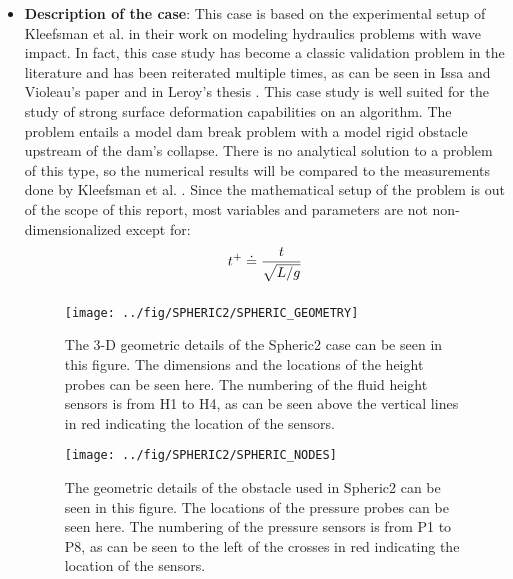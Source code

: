 \documentclass{../GPUSPHtemplate}
\begin{document}
\begin{itemize}
\item \textbf{Description of the case}: This case is based on the experimental setup of Kleefsman et al. \citep{Kleefsman}
  in their work on modeling hydraulics problems with wave impact.
  In fact, this case study has become a classic validation problem in the literature and has been reiterated multiple times,
  as can be seen in Issa and Violeau's paper \citep{SPHERIC} and in Leroy's thesis \citep{AgnesLeroy}. This case study is well
  suited for the study of strong surface deformation capabilities on an algorithm. The problem entails a model dam break
  problem with a model rigid obstacle upstream of the dam's collapse. There is no analytical solution to a problem of this type,
  so the numerical results will be compared to the measurements done by Kleefsman et al. \citep{Kleefsman}.
  Since the mathematical setup of the problem is out of the scope of this report, most variables and parameters are not non-dimensionalized except for: 
  \begin{equation}
    \begin{array}{l}
      \displaystyle{  t^{+} \doteq \frac{t}{\sqrt{L/g}} } \medskip \\ 
    \end{array}
    \end{equation}  

  \begin{figure}[h!]
    \texttt{[image: ../fig/SPHERIC2/SPHERIC\_GEOMETRY]}
    \centering
    \caption{ The 3-D geometric details of the Spheric2 case can be seen in this figure. The dimensions and the locations of the height probes can be seen here. The numbering of the fluid height sensors is from H1 to H4, as can be seen above the vertical lines in red indicating the location of the sensors.}
    \label{fig:SphericGeometry}
  \end{figure}
  
  \begin{figure}[h!]
    \texttt{[image: ../fig/SPHERIC2/SPHERIC\_NODES]}
    \centering
    \caption{ The geometric details of the obstacle used in Spheric2 can be seen in this figure. The locations of the pressure probes can be seen here. The numbering of the pressure sensors is from P1 to P8, as can be seen to the left of the crosses in red indicating the location of the sensors.}
    \label{fig:Spheric_Nodes}
  \end{figure}
  

\end{itemize}
\end{document}
